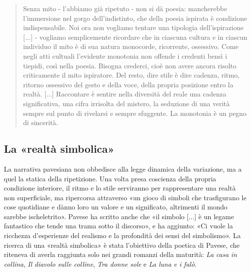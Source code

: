 \documentclass[a4paper, twoside, titlepage]{book}
\newcommand{\citazione}[1]{%
  \begin{quotation}
  \begin{linenumbers}
  \modulolinenumbers[5]
  \begingroup
  \setlength{\parindent}{0cm}
  \noindent #1
  \endgroup
  \end{linenumbers}
  \end{quotation}\setcounter{linenumber}{1}
  }
\begin{document}
\citazione{ Senza mito - l'abbiamo già ripetuto - non si dà poesia: mancherebbe l'immersione nel gorgo dell'indistinto, che della poesia ispirata è condizione indispensabile. Noi ora non vogliamo tentare una tipologia dell'ispirazione [...] - vogliamo semplicemente ricordare che in ciascuna cultura e in ciascun individuo il mito è di sua natura monocorde, ricorrente, ossessivo. Come negli atti cultuali l'evidente monotonia non offende i credenti bensì i tiepidi, così nella poesia. Bisogna crederci, cioè non avere ancora risolto criticamente il mito ispiratore. Del resto, dire stile è dire cadenza, ritmo, ritorno ossessivo del gesto e della voce, della propria posizione entro la realtà. [...] Raccontare è sentire nella diversità del reale una cadenza significativa, una cifra irrisolta del mistero, la seduzione di una verità sempre sul punto di rivelarsi e sempre sfuggente. La monotonia è un pegno di sincerità.}

\subsection{La «realtà simbolica»}

La narrativa pavesiana non obbedisce alla legge dinamica della variazione, ma a quel la statica della ripetizione. Una volta presa coscienza della propria condizione interiore, il ritmo e lo stile serviranno per rappresentare una realtà non superficiale, ma ripercorsa attraverso «un gioco di simboli che trasfigurano le cose quotidiane e dànno loro un valore e un significato, altrimenti il mondo sarebbe ischeletrito». Pavese ha scritto anche che «il simbolo [...] è un legame fantastico che tende una trama sotto il discorso», e ha aggiunto: «Ci vuole la ricchezza d'esperienze del realismo e la profondità dei sensi del simbolismo». La ricerca di una «realtà simbolica» è stata l'obiettivo della poetica di Pavese, che riteneva di averla raggiunta solo nei grandi romanzi della maturità: \textit{La casa in collina}, \textit{Il diavolo sulle colline}, \textit{Tra donne sole} e \textit{La luna e i falò}.
\end{document}
